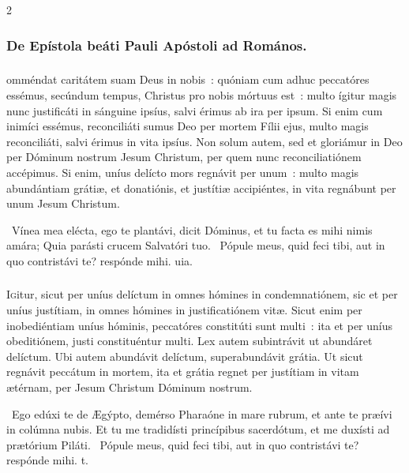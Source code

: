 \documentclass[9pt,twoside]{extarticle}
\begin{document}
\begin{multicols}{2}
{\subsubsection*{\center De Epístola beáti Pauli Apóstoli ad Romános.}
\subsubsection*{\center {}}
omméndat caritátem suam Deus in nobis~: quóniam cum adhuc peccatóres essémus, secúndum tempus, Christus pro nobis mórtuus est~: multo ígitur magis nunc justificáti in sánguine ipsíus, salvi érimus ab ira per ipsum. Si enim cum inimíci essémus, reconciliáti sumus Deo per mortem Fílii ejus, multo magis reconciliáti, salvi érimus in vita ipsíus. Non solum autem, sed et gloriámur in Deo per Dóminum nostrum Jesum Christum, per quem nunc reconciliatiónem accépimus. Si enim, uníus delícto mors regnávit per unum~: multo magis abundántiam grátiæ, et donatiónis, et justítiæ accipiéntes, in vita regnábunt per unum Jesum Christum.

\begin{tightlist}{}
\item {}~Vínea mea elécta, ego te plantávi, dicit Dóminus, et tu facta es mihi nimis amára; \textred{*} Quia parásti crucem Salvatóri tuo. ~Pópule meus, quid feci tibi, aut in quo contristávi te? respónde mihi. uia.
\end{tightlist}

\subsubsection*{\center{}}
\lettrine{I}gitur, sicut per uníus delíctum in omnes hómines in condemnatiónem, sic et per uníus justítiam, in omnes hómines in justificatiónem vitæ. Sicut enim per inobediéntiam uníus hóminis, peccatóres constitúti sunt multi~: ita et per uníus obeditiónem, justi constituéntur multi. Lex autem subintrávit ut abundáret delíctum. Ubi autem abundávit delíctum, superabundávit grátia. Ut sicut regnávit peccátum in mortem, ita et grátia regnet per justítiam in vitam ætérnam, per Jesum Christum Dóminum nostrum.

\begin{tightlist}{}
\item {}~Ego edúxi te de Ægýpto, demérso Pharaóne in mare rubrum, et ante te præívi in colúmna nubis. \textred{*} Et tu me tradidísti princípibus sacerdótum, et me duxísti ad prætórium Piláti. ~Pópule meus, quid feci tibi, aut in quo contristávi te? respónde mihi. t.
\end{tightlist}

}
\end{multicols}
\end{document}
